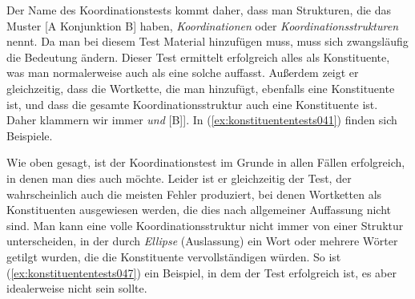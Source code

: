 
Der Name des Koordinationstests kommt daher, dass man Strukturen, die das Muster [A Konjunktion B] haben, \textit{Koordinationen} oder \textit{Koordinationsstrukturen} nennt.
Da man bei diesem Test Material hinzufügen muss, muss sich zwangsläufig die Bedeutung ändern.
Dieser Test ermittelt erfolgreich alles als Konstituente, was man normalerweise auch als eine solche auffasst.
Außerdem zeigt er gleichzeitig, dass die Wortkette, die man hinzufügt, ebenfalls eine Konstituente ist, und dass die gesamte Koordinationsstruktur auch eine Konstituente ist.
Daher klammern wir immer \zB [[A] \textit{und} [B]].
In (\ref{ex:konstituententests041}) finden sich Beispiele.

\begin{exe}
  \ex\label{ex:konstituententests041}
  \begin{xlist}
  \end{xlist}
\end{exe}

Wie oben gesagt, ist der Koordinationstest im Grunde in allen Fällen erfolgreich, in denen man dies auch möchte.
Leider ist er gleichzeitig der Test, der wahrscheinlich auch die meisten Fehler produziert, bei denen Wortketten als Konstituenten ausgewiesen werden, die dies nach allgemeiner Auffassung nicht sind.
Man kann eine volle Koordinationsstruktur nicht immer von einer Struktur unterscheiden, in der durch \textit{Ellipse} (Auslassung) ein Wort oder mehrere Wörter getilgt wurden, die die Konstituente vervollständigen würden.
So ist \zB (\ref{ex:konstituententests047}) ein Beispiel, in dem der Test erfolgreich ist, es aber idealerweise nicht sein sollte.


